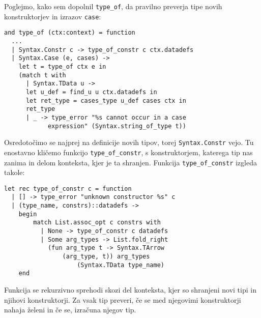 \documentclass[12pt,a4paper,openany]{book}
\begin{document}
Poglejmo, kako sem dopolnil \lstinline{type_of}, da pravilno preverja tipe novih konstruktorjev in izrazov \lstinline{case}:
\begin{lstlisting}
and type_of (ctx:context) = function
  ...
  | Syntax.Constr c -> type_of_constr c ctx.datadefs
  | Syntax.Case (e, cases) -> 
    let t = type_of ctx e in
    (match t with
      | Syntax.TData u -> 
      let u_def = find_u u ctx.datadefs in
      let ret_type = cases_type u_def cases ctx in
      ret_type
      | _ -> type_error "%s cannot occur in a case 
            expression" (Syntax.string_of_type t))
\end{lstlisting}
Osredotočimo se najprej na definicije novih tipov, torej \lstinline{Syntax.Constr} vejo. Tu enostavno kličemo funkcijo \lstinline{type_of_constr}, s konstruktorjem, katerega tip nas zanima in delom 
konteksta, kjer je ta shranjen. Funkcija \lstinline{type_of_constr} izgleda takole:
\begin{lstlisting}
let rec type_of_constr c = function
  | [] -> type_error "unknown constructor %s" c
  | (type_name, constrs)::datadefs -> 
    begin
        match List.assoc_opt c constrs with
          | None -> type_of_constr c datadefs
          | Some arg_types -> List.fold_right 
            (fun arg_type t -> Syntax.TArrow 
                (arg_type, t)) arg_types 
                    (Syntax.TData type_name) 
    end
\end{lstlisting}
Funkcija se rekurzivno sprehodi skozi del konteksta, kjer so shranjeni novi tipi in njihovi konstruktorji. Za vsak tip preveri, če se med njegovimi konstruktorji nahaja želeni in če se, izračuna 
njegov tip. 
\end{document}
